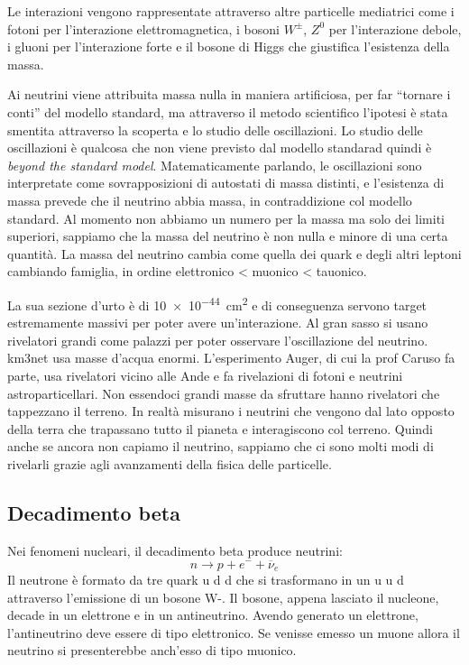         Le interazioni vengono rappresentate attraverso altre particelle mediatrici come i fotoni per l'interazione elettromagnetica, i bosoni $W^\pm$, $Z^0$ per l'interazione debole, i gluoni per l'interazione forte e il bosone di Higgs che giustifica l'esistenza della massa.

        Ai neutrini viene attribuita massa nulla in maniera artificiosa, per far ``tornare i conti'' del modello standard, ma attraverso il metodo scientifico l'ipotesi è stata smentita attraverso la scoperta e lo studio delle oscillazioni. Lo studio delle oscillazioni è qualcosa che non viene previsto dal modello standarad quindi è \emph{beyond the standard model}. Matematicamente parlando, le oscillazioni sono interpretate come sovrapposizioni di autostati di massa distinti, e l'esistenza di massa prevede che il neutrino abbia massa, in contraddizione col modello standard. Al momento non abbiamo un numero per la massa ma solo dei limiti superiori, sappiamo che la massa del neutrino è non nulla e minore di una certa quantità. La massa del neutrino cambia come quella dei quark e degli altri leptoni cambiando famiglia, in ordine elettronico < muonico < tauonico.

        La sua sezione d'urto è di \SI{10e-44}{\centi\meter\squared} e di conseguenza servono target estremamente massivi per poter avere un'interazione. Al gran sasso si usano rivelatori grandi come palazzi per poter osservare l'oscillazione del neutrino. km3net usa masse d'acqua enormi. L'esperimento Auger, di cui la prof Caruso fa parte, usa rivelatori vicino alle Ande e fa rivelazioni di fotoni e neutrini astroparticellari. Non essendoci grandi masse da sfruttare hanno rivelatori che tappezzano il terreno. In realtà misurano i neutrini che vengono dal lato opposto della terra che trapassano tutto il pianeta e interagiscono col terreno. Quindi anche se ancora non capiamo il neutrino, sappiamo che ci sono molti modi di rivelarli grazie agli avanzamenti della fisica delle particelle.
    \subsection{Decadimento beta}
        Nei fenomeni nucleari, il decadimento beta produce neutrini:
        \begin{equation*}
            n \rightarrow p + e^- + \overline{\nu}_e
        \end{equation*}
        Il neutrone è formato da tre quark u d d che si trasformano in un u u d attraverso l'emissione di un bosone W-. Il bosone, appena lasciato il nucleone, decade in un elettrone e in un antineutrino. Avendo generato un elettrone, l'antineutrino deve essere di tipo elettronico. Se venisse emesso un muone allora il neutrino si presenterebbe anch'esso di tipo muonico.
